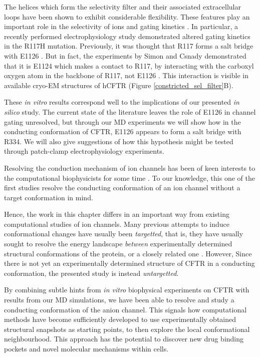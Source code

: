 The helices which form the selectivity filter and their associated extracellular loops have been shown to exhibit considerable flexibility. These features play an important role in the selectivity of ions and gating kinetics \cite{linsdell1998, kim2019, negoda2018, negoda2019}. In particular, a recently performed electrophysiology study demonstrated altered gating kinetics in the R117H mutation. Previously, it was thought that R117 forms a salt bridge with E1126 \cite{cui2014}. But in fact, the experiments by Simon and Csnady demonstrated that it is E1124 which makes a contact to R117, by interacting with the carboxyl oxygen atom in the backbone of R117, not E1126 \cite{simon2021}. This interaction is visible in available cryo-EM structures of hCFTR (Figure \ref{constricted_sel_filter}B). 

These \textit{in vitro} results correspond well to the implications of our presented \textit{in silico} study. The current state of the literature leaves the role of E1126 in channel gating unresolved, but through our MD experiments we will show how in the conducting conformation of CFTR, E1126 appears to form a salt bridge with R334. We will also give suggestions of how this hypothesis might be tested through patch-clamp electrophysiology experiments. 

Resolving the conduction mechanism of ion channels has been of keen interests to the computational biophysicists for some time \cite{black2020, flood2019}. To our knowledge, this one of the first studies resolve the conducting conformation of an ion channel without a target conformation in mind. 

Hence, the work in this chapter differs in an important way from existing computational studies of ion channels. Many previous attempts to induce conformational changes have usually been \textit{targetted}, that is, they have usually sought to resolve the energy landscape \textit{between} experimentally determined structural conformations of the protein, or a closely related one \cite{hoffmann2018, lev2020, bergh2021, mccomas2022}. However, Since there is not yet an experimentally determined structure of CFTR in a conducting conformation, the presented study is instead \textit{untargetted}. 

By combining subtle hints from \textit{in vitro} biophysical experiments on CFTR with results from our MD simulations, we have been able to resolve and study a conducting conformation of the anion channel. This signals how computational methods have become sufficiently developed to use experimentally obtained structural snapshots as starting points, to then explore the local conformational neighbourhood. This approach has the potential to discover new drug binding pockets and novel molecular mechanisms within cells.

